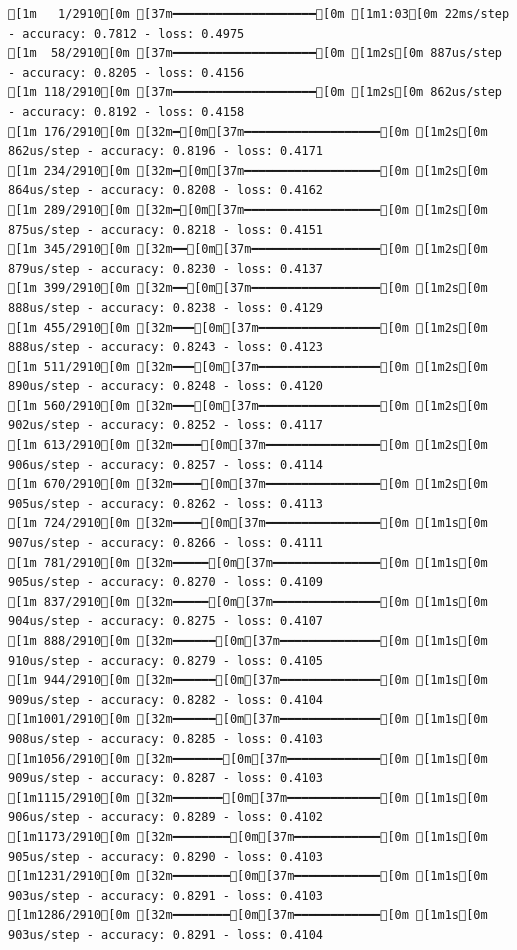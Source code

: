 \documentclass[
  letterpaper,
  DIV=11,
  numbers=noendperiod]{scrartcl}
\begin{document}
\begin{verbatim}
[1m   1/2910[0m [37m━━━━━━━━━━━━━━━━━━━━[0m [1m1:03[0m 22ms/step - accuracy: 0.7812 - loss: 0.4975
[1m  58/2910[0m [37m━━━━━━━━━━━━━━━━━━━━[0m [1m2s[0m 887us/step - accuracy: 0.8205 - loss: 0.4156 
[1m 118/2910[0m [37m━━━━━━━━━━━━━━━━━━━━[0m [1m2s[0m 862us/step - accuracy: 0.8192 - loss: 0.4158
[1m 176/2910[0m [32m━[0m[37m━━━━━━━━━━━━━━━━━━━[0m [1m2s[0m 862us/step - accuracy: 0.8196 - loss: 0.4171
[1m 234/2910[0m [32m━[0m[37m━━━━━━━━━━━━━━━━━━━[0m [1m2s[0m 864us/step - accuracy: 0.8208 - loss: 0.4162
[1m 289/2910[0m [32m━[0m[37m━━━━━━━━━━━━━━━━━━━[0m [1m2s[0m 875us/step - accuracy: 0.8218 - loss: 0.4151
[1m 345/2910[0m [32m━━[0m[37m━━━━━━━━━━━━━━━━━━[0m [1m2s[0m 879us/step - accuracy: 0.8230 - loss: 0.4137
[1m 399/2910[0m [32m━━[0m[37m━━━━━━━━━━━━━━━━━━[0m [1m2s[0m 888us/step - accuracy: 0.8238 - loss: 0.4129
[1m 455/2910[0m [32m━━━[0m[37m━━━━━━━━━━━━━━━━━[0m [1m2s[0m 888us/step - accuracy: 0.8243 - loss: 0.4123
[1m 511/2910[0m [32m━━━[0m[37m━━━━━━━━━━━━━━━━━[0m [1m2s[0m 890us/step - accuracy: 0.8248 - loss: 0.4120
[1m 560/2910[0m [32m━━━[0m[37m━━━━━━━━━━━━━━━━━[0m [1m2s[0m 902us/step - accuracy: 0.8252 - loss: 0.4117
[1m 613/2910[0m [32m━━━━[0m[37m━━━━━━━━━━━━━━━━[0m [1m2s[0m 906us/step - accuracy: 0.8257 - loss: 0.4114
[1m 670/2910[0m [32m━━━━[0m[37m━━━━━━━━━━━━━━━━[0m [1m2s[0m 905us/step - accuracy: 0.8262 - loss: 0.4113
[1m 724/2910[0m [32m━━━━[0m[37m━━━━━━━━━━━━━━━━[0m [1m1s[0m 907us/step - accuracy: 0.8266 - loss: 0.4111
[1m 781/2910[0m [32m━━━━━[0m[37m━━━━━━━━━━━━━━━[0m [1m1s[0m 905us/step - accuracy: 0.8270 - loss: 0.4109
[1m 837/2910[0m [32m━━━━━[0m[37m━━━━━━━━━━━━━━━[0m [1m1s[0m 904us/step - accuracy: 0.8275 - loss: 0.4107
[1m 888/2910[0m [32m━━━━━━[0m[37m━━━━━━━━━━━━━━[0m [1m1s[0m 910us/step - accuracy: 0.8279 - loss: 0.4105
[1m 944/2910[0m [32m━━━━━━[0m[37m━━━━━━━━━━━━━━[0m [1m1s[0m 909us/step - accuracy: 0.8282 - loss: 0.4104
[1m1001/2910[0m [32m━━━━━━[0m[37m━━━━━━━━━━━━━━[0m [1m1s[0m 908us/step - accuracy: 0.8285 - loss: 0.4103
[1m1056/2910[0m [32m━━━━━━━[0m[37m━━━━━━━━━━━━━[0m [1m1s[0m 909us/step - accuracy: 0.8287 - loss: 0.4103
[1m1115/2910[0m [32m━━━━━━━[0m[37m━━━━━━━━━━━━━[0m [1m1s[0m 906us/step - accuracy: 0.8289 - loss: 0.4102
[1m1173/2910[0m [32m━━━━━━━━[0m[37m━━━━━━━━━━━━[0m [1m1s[0m 905us/step - accuracy: 0.8290 - loss: 0.4103
[1m1231/2910[0m [32m━━━━━━━━[0m[37m━━━━━━━━━━━━[0m [1m1s[0m 903us/step - accuracy: 0.8291 - loss: 0.4103
[1m1286/2910[0m [32m━━━━━━━━[0m[37m━━━━━━━━━━━━[0m [1m1s[0m 903us/step - accuracy: 0.8291 - loss: 0.4104

\end{verbatim}
\end{document}
